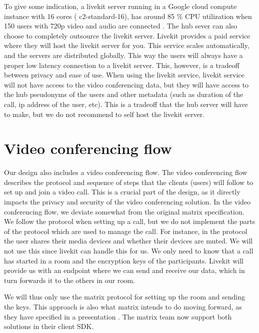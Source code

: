 \documentclass{report}
\begin{document}
To give some indication, a livekit server running in a Google cloud compute instance with 16 cores (
c2-standard-16), has around 85 \% CPU utilization when 150 users with 720p video and audio are connected
\cite{noauthor_benchmarking_nodate}. The hub sever can also choose to completely outsource the livekit server.
Livekit provides a paid service where they will host the livekit server for you. This service scales
automatically, and the servers are distributed globally. This way the users will always have a proper low
latency connection to a livekit server. This, however, is a tradeoff between privacy and ease of use. When using
the livekit service, livekit service will not have access to the video conferencing data, but they will have access to
the hub pseudonyms of the users and other metadata (such as duration of the call, ip address of the user, etc). This
is a tradeoff that the hub server will have to make, but we do not recommend to self host the livekit server.

\section{Video conferencing flow}
Our design also includes a video conferencing flow. The video conferencing flow describes the protocol and sequence
of steps that the clients (users) will follow to set up and join a video call.
This is a crucial part of the design, as it directly impacts the privacy and security of the video conferencing solution.
In the video conferencing flow, we deviate somewhat from the original matrix specification. We follow the protocol
when setting up a call, but we do not implement the parts of the protocol which are used to manage the call. For
instance, in the protocol the user shares their media devices and whether their devices are muted. We will not use
this since livekit can handle this for us. We only need to know that a call has started in a room and the encryption
keys of the participants. Livekit will provide us with an endpoint where we can send and receive our data, which in
turn forwards it to the others in our room.

We will thus only use the matrix protocol for setting up the room and sending the keys. This approach is also what
matrix intends to do moving forward, as they have specified in a presentation \cite{nirve_matrixrtc_nodate}. The
matrix team now support both solutions in their client SDK.
\end{document}
